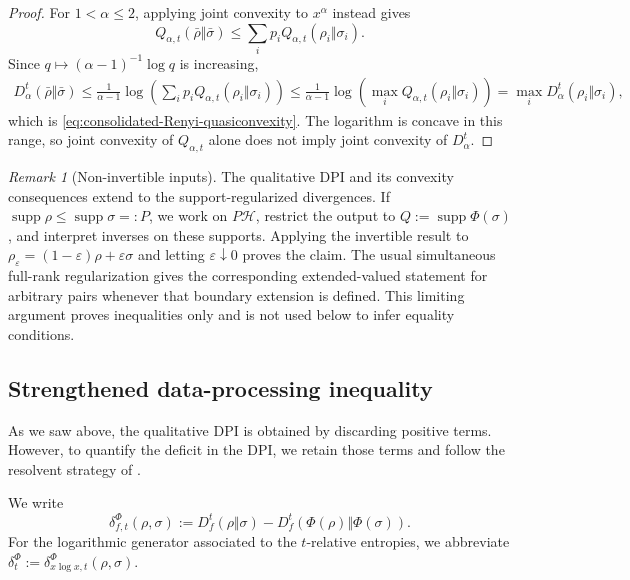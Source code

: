 \documentclass[11pt]{article}
\theoremstyle{remark}
\newtheorem{remark}[remark]{Remark}
\newcommand{\1}{\mathbbm{1}}
\begin{document}
\begin{proof}
For $1<\alpha\leq2$, applying joint convexity to $x^\alpha$ instead
gives
\begin{equation*}
 Q_{\alpha,t}(\bar\rho\Vert\bar\sigma)
 \leq\sum_i p_iQ_{\alpha,t}(\rho_i\Vert\sigma_i).
\end{equation*}
Since $q\mapsto(\alpha-1)^{-1}\log q$ is increasing,
\begin{align*}
 D_\alpha^t(\bar\rho\Vert\bar\sigma)
 \leq\frac{1}{\alpha-1}
       \log\!\left(\sum_i p_i
       Q_{\alpha,t}(\rho_i\Vert\sigma_i)\right)
 \leq\frac{1}{\alpha-1}
       \log\!\left(\max_i
       Q_{\alpha,t}(\rho_i\Vert\sigma_i)\right)
 =\max_iD_\alpha^t(\rho_i\Vert\sigma_i),
\end{align*}
which is \eqref{eq:consolidated-Renyi-quasiconvexity}.  The logarithm
is concave in this range, so joint convexity of $Q_{\alpha,t}$ alone
does not imply joint convexity of $D_\alpha^t$.
\end{proof}

\begin{remark}[Non-invertible inputs]
The qualitative DPI and its convexity consequences extend to the
support-regularized divergences.  If
$\operatorname{supp}\rho\leq\operatorname{supp}\sigma=:P$, we work
on $P\mathcal H$, restrict the output to
$Q:=\operatorname{supp}\Phi(\sigma)$, and interpret inverses on these
supports.  Applying the invertible result to
$\rho_\varepsilon=(1-\varepsilon)\rho+\varepsilon\sigma$ and letting
$\varepsilon\downarrow0$ proves the claim.  The usual simultaneous
full-rank regularization gives the corresponding extended-valued
statement for arbitrary pairs whenever that boundary extension is
defined.  This limiting argument proves inequalities only and is not
used below to infer equality conditions.
\end{remark}

\subsection{Strengthened data-processing inequality}

As we saw above, the qualitative DPI is obtained by discarding positive terms.  However,
to quantify the deficit in the DPI, we retain those terms and follow the resolvent
strategy of
\cite{carlen2018recovery,bluhm2020strengthened}.

We write
\begin{equation}
 \delta_{f,t}^{\Phi}(\rho,\sigma)
 :=D_f^t(\rho\Vert\sigma)
 -D_f^t(\Phi(\rho)\Vert\Phi(\sigma)).
 \label{eq:consolidated-dpi-defect}
\end{equation}
For the logarithmic generator associated to the $t$-relative entropies, we abbreviate
$\delta_t^\Phi:=\delta_{x\log x,t}^\Phi(\rho,\sigma)$.
\end{document}
